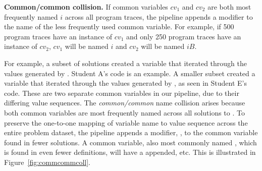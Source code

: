 {\bf Common/common collision.} If common variables $cv_{1}$ and $cv_{2}$ are both most frequently named $i$ across all program traces, the pipeline appends a modifier to the name of the less frequently used common variable. For example, if 500 program traces have an instance of $cv_{1}$ and only 250 program traces have an instance of $cv_{2}$, $cv_{1}$ will be named $i$ and $cv_{2}$ will be named $iB$.  

For example, a subset of  solutions created a variable that iterated through the values generated by . Student A's code is an example. A smaller subset created a variable that iterated through the values generated by , as seen in Student E's code. These are two separate common variables in our pipeline, due to their differing value sequences. The {\it common/common} name collision arises because both common variables are most frequently named  across all solutions to . To preserve the one-to-one mapping of variable name to value sequence across the entire  problem dataset, the pipeline appends a modifier, , to the common variable  found in fewer  solutions. A common variable, also most commonly named , which is found in even fewer  definitions, will have a  appended, etc. This is illustrated in Figure~\ref{fig:commcommcoll}.
